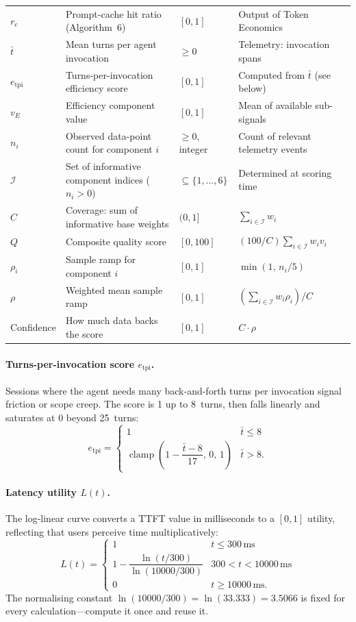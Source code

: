 \documentclass[11pt,a4paper]{article}
\newcommand{\calI}{\mathcal{I}}
\newcommand{\clamp}[3]{\operatorname{clamp}\!\left(#1,\,#2,\,#3\right)}
\begin{document}
\begin{table}[h!]
\begin{tabular}{@{}p{1.7cm}p{4.4cm}p{2.0cm}p{5.2cm}@{}}
$r_c$ & Prompt-cache hit ratio (Algorithm~6) & $[0,1]$ & Output of Token Economics \\
$\bar{t}$ & Mean turns per agent invocation & $\geq 0$ & Telemetry: invocation spans \\
$e_{\mathrm{tpi}}$ & Turns-per-invocation efficiency score & $[0,1]$ & Computed from $\bar{t}$ (see below) \\
$v_E$ & Efficiency component value & $[0,1]$ & Mean of available sub-signals \\
$n_i$ & Observed data-point count for component $i$ & $\geq 0$, integer & Count of relevant telemetry events \\
$\calI$ & Set of informative component indices ($n_i>0$) & $\subseteq\{1,\ldots,6\}$ & Determined at scoring time \\
$C$ & Coverage: sum of informative base weights & $(0,1]$ & $\sum_{i\in\calI}w_i$ \\
$Q$ & Composite quality score & $[0,100]$ & $(100/C)\sum_{i\in\calI}w_iv_i$ \\
$\rho_i$ & Sample ramp for component $i$ & $[0,1]$ & $\min(1,\,n_i/5)$ \\
$\rho$ & Weighted mean sample ramp & $[0,1]$ & $(\sum_{i\in\calI}w_i\rho_i)/C$ \\
Confidence & How much data backs the score & $[0,1]$ & $C\cdot\rho$ \\
\bottomrule
\end{tabular}
\end{table}

\paragraph{Turns-per-invocation score $e_{\mathrm{tpi}}$.}
Sessions where the agent needs many back-and-forth turns per invocation
signal friction or scope creep.  The score is 1 up to 8~turns, then falls
linearly and saturates at 0 beyond 25~turns:
\[
  e_{\mathrm{tpi}} =
  \begin{cases}
    1 & \bar{t} \leq 8 \\
    \clamp{1 - \dfrac{\bar{t}-8}{17}}{0}{1} & \bar{t} > 8.
  \end{cases}
\]

\paragraph{Latency utility $L(t)$.}
The log-linear curve converts a TTFT value in milliseconds to a $[0,1]$
utility, reflecting that users perceive time multiplicatively:
\[
  L(t) =
  \begin{cases}
    1 & t \leq 300\,\text{ms} \\
    1 - \dfrac{\ln(t/300)}{\ln(10000/300)} & 300 < t < 10000\,\text{ms} \\
    0 & t \geq 10000\,\text{ms.}
  \end{cases}
\]
The normalising constant $\ln(10000/300) = \ln(33.333) = 3.5066$ is fixed
for every calculation---compute it once and reuse it.
\end{document}
